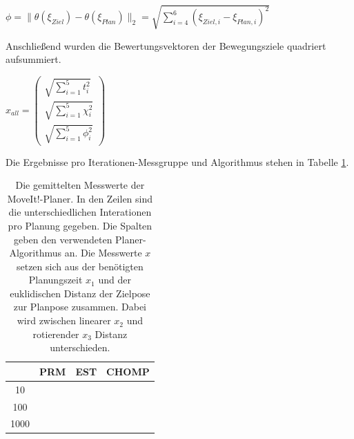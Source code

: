 \begin{math}
	\phi = \|\theta(\xi_{Ziel}) - \theta(\xi_{Plan})\|_2 = \sqrt{\sum_{i=4}^{6}(\xi_{Ziel,i}-\xi_{Plan,i})^2}
\end{math}

Anschließend wurden die Bewertungsvektoren der Bewegungsziele quadriert aufsummiert.

\begin{math}
	x_{all} = \left(\begin{array}{c}  
					\sqrt{\sum_{i=1}^{5} t_i^2}\\ 
					\sqrt{\sum_{i=1}^{5} \chi_i^2} \\
					\sqrt{\sum_{i=1}^{5} \phi_i^2} \end{array}\right)	
\end{math}


Die Ergebnisse pro Iterationen-Messgruppe und Algorithmus stehen in Tabelle \ref{tab:mesplan}.

\begin{table}
	
	
	\centering
	\begin{tabular}{|c|c|c|c|}
		\hline  	& PRM & EST & CHOMP \\ 
		\hline 10 	&  &  &  \\ 
		\hline 100 	&  &  &  \\ 
		\hline 1000 &  &  &  \\ 
		\hline 
	\end{tabular}
	
	\caption[Gemittelte Messwerte der MoveIt!-Planer-Algorithmen]{Die gemittelten Messwerte der MoveIt!-Planer. In den Zeilen sind die unterschiedlichen Interationen pro Planung gegeben. Die Spalten geben den verwendeten Planer-Algorithmus an. Die Messwerte $x$ setzen sich aus der benötigten Planungszeit $x_1$ und der euklidischen Distanz der Zielpose zur Planpose zusammen. Dabei wird zwischen linearer $x_2$ und rotierender $x_3$ Distanz unterschieden.}
	
	\label{tab:mesplan}
\end{table}
	

